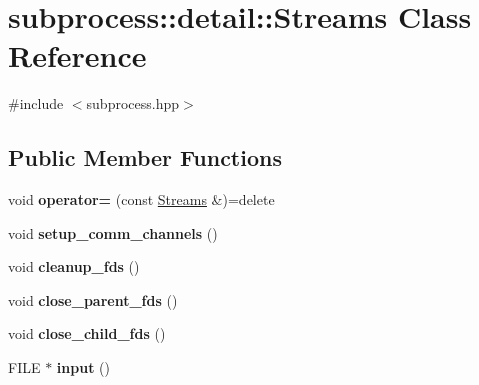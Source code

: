 \hypertarget{classsubprocess_1_1detail_1_1Streams}{}\section{subprocess\+:\+:detail\+:\+:Streams Class Reference}
\label{classsubprocess_1_1detail_1_1Streams}


{\ttfamily \#include $<$subprocess.\+hpp$>$}

\subsection*{Public Member Functions}
\begin{DoxyCompactItemize}
\item 
\mbox{\label{classsubprocess_1_1detail_1_1Streams_a4778d731dd11319748d54558cec7c597}} 
void {\bfseries operator=} (const \hyperlink{classsubprocess_1_1detail_1_1Streams}{Streams} \&)=delete
\item 
\mbox{\label{classsubprocess_1_1detail_1_1Streams_a34854f7864ff24ba9a6950ce5350c789}} 
void {\bfseries setup\+\_\+comm\+\_\+channels} ()
\item 
\mbox{\label{classsubprocess_1_1detail_1_1Streams_a820c3a9f1f97d2143ecc5fdb5843c6ce}} 
void {\bfseries cleanup\+\_\+fds} ()
\item 
\mbox{\label{classsubprocess_1_1detail_1_1Streams_ab1da9aa8c58cd38acbc6e8d8336d1378}} 
void {\bfseries close\+\_\+parent\+\_\+fds} ()
\item 
\mbox{\label{classsubprocess_1_1detail_1_1Streams_a2e454392653a7e9c65d476fab5e52318}} 
void {\bfseries close\+\_\+child\+\_\+fds} ()
\item 
\mbox{\label{classsubprocess_1_1detail_1_1Streams_a6c38d1101a5e8ab13f437545f8bddf15}} 
F\+I\+LE $\ast$ {\bfseries input} ()
\item 
\mbox{\label{classsubprocess_1_1detail_1_1Streams_aa930cb9570f059967d6c0665965456cb}} 

\end{DoxyCompactItemize}
